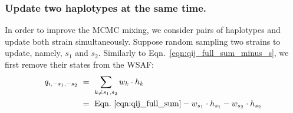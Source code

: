 \documentclass{bioinfo}
\begin{document}







\subsubsection{Update two haplotypes at the same time.}
In order to improve the MCMC mixing, we consider pairs of haplotypes and update both strain simultaneously. Suppose random sampling two strains to update, namely, $s_1$ and $s_2$. Similarly to Eqn.~\eqref{eqn:qij_full_sum_minus_s}, we first remove their states from the WSAF:
\begin{equation}
\begin{split}
q_{i,-s_1, -s_2} & ~ = ~ \sum_{k\neq s_1,s_2} w_k \cdot h_k \\
                 & ~ = ~ \textrm{Eqn.~\eqref{eqn:qij_full_sum}} - w_{s_1} \cdot h_{s_1} - w_{s_2} \cdot h_{s_2} \label{eqn:qij_full_sum_minus_s1_s2}
\end{split}
\end{equation}
\end{document}
